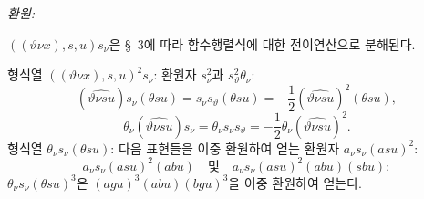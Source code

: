
\noindent\emph{환원:}

$((\vartheta \nu x),s,u)s_\nu$은 \S\ 3에 따라 함수행렬식에 대한 전이연산으로 분해된다.

형식열 $((\vartheta \nu x),s,u)^2s_\nu$: 환원자 $s_\nu^2$과 $s_\vartheta^2\theta_\nu$:
\[
(\widehat{\vartheta \nu su})s_\nu(\theta su)=s_\nu s_\vartheta(\theta su)=-\frac12(\widehat{\vartheta \nu su})^2(\theta su),
\]
\[
\theta_\nu(\widehat{\vartheta \nu su})s_\nu=\theta_\nu s_\nu s_\vartheta=-\frac12\theta_\nu(\widehat{\vartheta \nu su})^2.
\]
형식열 $\theta_\nu s_\nu(\theta su)$: 다음 표현들을 이중 환원하여 얻는 환원자 $a_\nu s_\nu(asu)^2$:
\[
a_\nu s_\nu(asu)^2(abu)\quad\text{및}\quad a_\nu s_\nu(asu)^2(abu)(sbu);
\]
$\theta_\nu s_\nu(\theta su)^3$은 $(agu)^3(abu)(bgu)^3$을 이중 환원하여 얻는다.

